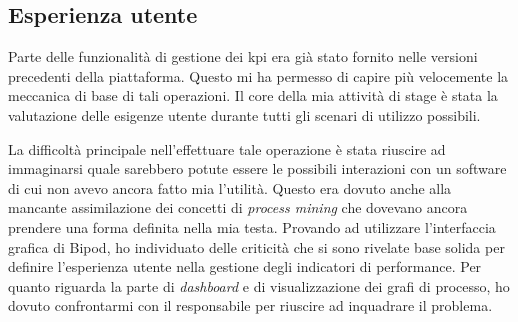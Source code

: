 \subsection{Esperienza utente}
Parte delle funzionalità di gestione dei \acrshort{kpi} era già stato fornito nelle versioni precedenti della piattaforma. Questo mi ha permesso di capire più velocemente la meccanica di base di tali operazioni. Il core della mia attività di stage è stata la valutazione delle esigenze utente durante tutti gli scenari di utilizzo possibili.

La difficoltà principale nell'effettuare tale operazione è stata riuscire ad immaginarsi quale sarebbero potute essere le possibili interazioni con un software di cui non avevo ancora fatto mia l'utilità. Questo era dovuto anche alla mancante assimilazione dei concetti di \textit{process mining} che dovevano ancora prendere una forma definita nella mia testa.
Provando ad utilizzare l'interfaccia grafica di Bipod, ho individuato delle criticità che si sono rivelate base solida per definire l'esperienza utente nella gestione degli indicatori di performance.
Per quanto riguarda la parte di \textit{dashboard} e di visualizzazione dei grafi di processo, ho dovuto confrontarmi con il responsabile per riuscire ad inquadrare il problema.


